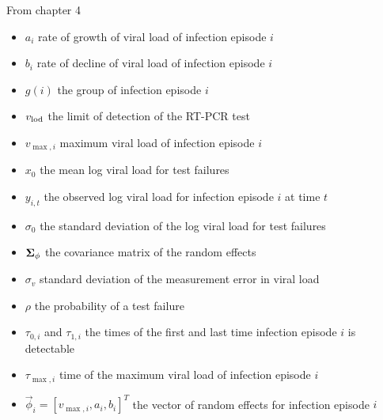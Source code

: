 \documentclass[thesis.tex]{subfiles}
\begin{document}
From chapter 4
\begin{itemize}
    \item $a_i$ rate of growth of viral load of infection episode $i$
    \item $b_i$ rate of decline of viral load of infection episode $i$
    \item $g(i)$ the group of infection episode $i$
    \item $v_\text{lod}$ the limit of detection of the RT-PCR test
    \item $v_{\max,i}$ maximum viral load of infection episode $i$
    \item $x_0$ the mean log viral load for test failures
    \item $y_{i,t}$ the observed log viral load for infection episode $i$ at time $t$
    \item $\sigma_0$ the standard deviation of the log viral load for test failures
    \item $\bm{\Sigma}_\phi$ the covariance matrix of the random effects
    \item $\sigma_v$ standard deviation of the measurement error in viral load
    \item $\rho$ the probability of a test failure
    \item $\tau_{0,i}$ and $\tau_{1,i}$ the times of the first and last time infection episode $i$ is detectable
    \item $\tau_{\max,i}$ time of the maximum viral load of infection episode $i$
    \item $\vec{\phi}_i = [v_{\max,i}, a_i, b_i]^T$ the vector of random effects for infection episode $i$
\end{itemize}
\end{document}
